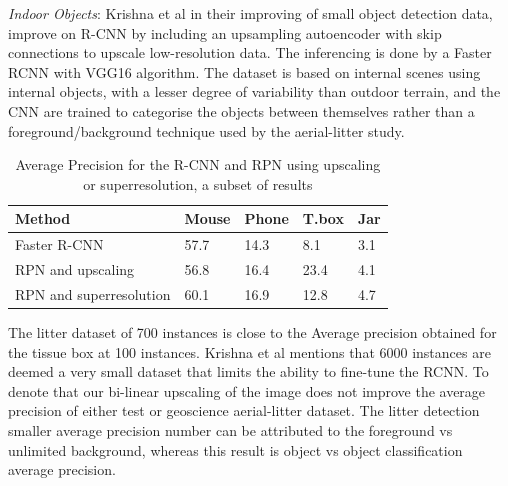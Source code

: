 \documentclass{IEEEtran}
\begin{document}
\textit{Indoor Objects}: Krishna et al \cite{Krishna} in their improving of small object detection data, improve on R-CNN by including an upsampling autoencoder with skip connections to upscale low-resolution data. The inferencing is done by a Faster RCNN with VGG16 algorithm. The dataset is based on internal scenes using internal objects, with a lesser degree of variability than outdoor terrain, and the CNN are trained to categorise the objects between themselves rather than a foreground/background technique used by the aerial-litter study.

\begin{table}[h]
\caption{Average Precision for the R-CNN and RPN using upscaling or superresolution, a subset of results}
\centering
\begin{tabular}{lllll}
\hline
\textbf{Method}                         & \textbf{Mouse}            & \textbf{Phone}            & \textbf{T.box}            & \textbf{Jar}             \\ \hline
\multicolumn{1}{|l|}{Faster R-CNN}      & \multicolumn{1}{l|}{57.7} & \multicolumn{1}{l|}{14.3} & \multicolumn{1}{l|}{8.1}  & \multicolumn{1}{l|}{3.1} \\ \hline
\multicolumn{1}{|l|}{RPN and upscaling} & \multicolumn{1}{l|}{56.8} & \multicolumn{1}{l|}{16.4} & \multicolumn{1}{l|}{23.4} & \multicolumn{1}{l|}{4.1} \\ \hline
RPN and superresolution                 & 60.1                      & 16.9                      & 12.8                      & 4.7                      \\ \hline
\end{tabular}
\end{table}

The litter dataset of 700 instances is close to the Average precision obtained for the tissue box at 100 instances. Krishna et al \cite{Krishna} mentions that 6000 instances are deemed a very small dataset that limits the ability to fine-tune the RCNN. To denote that our bi-linear upscaling of the image does not improve the average precision of either test or geoscience aerial-litter dataset. The litter detection smaller average precision number can be attributed to the foreground vs unlimited background, whereas this result is object vs object classification average precision.\newline
\end{document}

